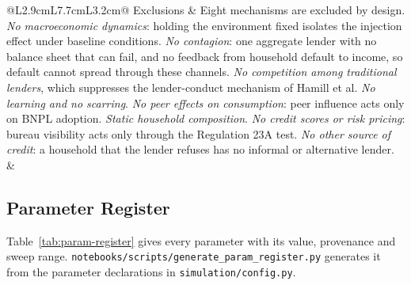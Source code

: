 \begin{longtable}{@{}L{2.9cm}L{7.7cm}L{3.2cm}@{}}
\addlinespace
Exclusions & Eight mechanisms are excluded by design. \emph{No macroeconomic dynamics}: holding the environment fixed isolates the injection effect under baseline conditions. \emph{No contagion}: one aggregate lender with no balance sheet that can fail, and no feedback from household default to income, so default cannot spread through these channels. \emph{No competition among traditional lenders}, which suppresses the lender-conduct mechanism of Hamill et al. \emph{No learning and no scarring}. \emph{No peer effects on consumption}: peer influence acts only on \ac{BNPL} adoption. \emph{Static household composition}. \emph{No credit scores or risk pricing}: bureau visibility acts only through the Regulation 23A test. \emph{No other source of credit}: a household that the lender refuses has no informal or alternative lender. & \citet{hamill2023creditcard,cardaci2018inequality} \\
\end{longtable}
\endgroup

\subsection{Parameter Register}\label{app:register}

Table~\ref{tab:param-register} gives every parameter with its value, provenance and sweep range.
\texttt{notebooks/scripts/generate\_param\_register.py} generates it from the parameter
declarations in \texttt{simulation/config.py}.

